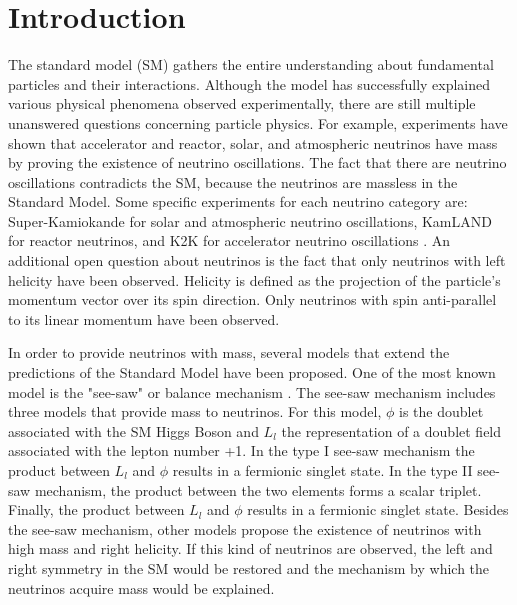 \section{Introduction}

The standard model (SM) gathers the entire understanding about fundamental particles and their interactions. Although the model has successfully explained various physical phenomena observed experimentally, there are still multiple unanswered questions concerning particle physics. For example, experiments \cite{Detectores} have shown that accelerator and reactor, solar, and atmospheric neutrinos have mass by proving the existence of neutrino oscillations. The fact that there are neutrino oscillations contradicts the SM, because the neutrinos are massless in the Standard Model. Some specific experiments for each neutrino category are: Super-Kamiokande \cite{Super-Kamiokande} for solar and atmospheric neutrino oscillations, KamLAND \cite{KamLAND} for reactor neutrinos, and K2K \cite{K2K} for accelerator neutrino oscillations \cite{Experimentos}. An additional open question about neutrinos is the fact that only neutrinos with left helicity have been observed. Helicity is defined as the projection of the particle's momentum vector over its spin direction. Only neutrinos with spin anti-parallel to its linear momentum have been observed.

In order to provide neutrinos with mass, several models that extend the predictions of the Standard Model have been proposed. One of the most known model is the "see-saw" or balance mechanism \cite{See-saw}. The see-saw mechanism includes three models that provide mass to neutrinos. For this model, $\phi$ is the doublet associated with the SM Higgs Boson and $L_{l}$ the representation of a doublet field associated with the lepton number +1. In the type I see-saw mechanism the product between $L_{l}$ and $\phi$ results in a fermionic singlet state. In the type II see-saw mechanism, the product between the two elements forms a scalar triplet. Finally, the product between $L_{l}$ and $\phi$ results in a fermionic singlet state. Besides the see-saw mechanism, other models propose the existence of neutrinos with high mass and right helicity. If this kind of neutrinos are observed, the left and right symmetry in the SM would be restored and the mechanism by which the neutrinos acquire mass would be explained.


